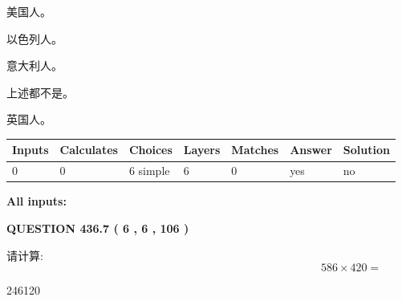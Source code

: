 \documentclass{ctexart}
\begin{document}
 
美国人。
 
 
以色列人。
 
 
意大利人。
 
 
 上述都不是。
 
 
\noindent{}
 
 
英国人。
 
 
\noindent{}
 
 
   
   
   
   
\noindent\begin{tabular}{|l|l|l|l|l|l|l|}
 \hline
Inputs & Calculates & Choices & Layers & Matches & Answer & Solution \\ \hline
 0  & 
 0  & 
 6
  simple  
  & 
 6  & 
 0  & 
  yes & 
  no 
  \\ \hline
 \end{tabular}
   
   
   
   
\noindent{}
   
   
   
   
\noindent\vspace{0.1in}\hspace{-0.08in} {\textbf{\Large{All inputs: }}}
   
   
  
\vspace{0.2in}
  
{\textbf{\Large{QUESTION
436.7 
 ( 6 , 6 , 106 )
}}}
  
  
 
请计算:
\begin{equation}
586  \times    %
420 = \nonumber
\end{equation}
 
 
 
\noindent{}
 
 

246120
 
 
\noindent{}
 
\end{document}
